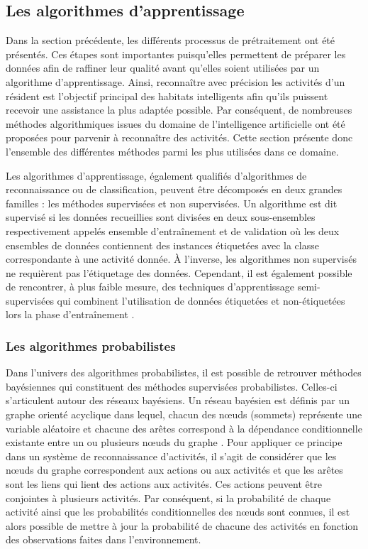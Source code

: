 \subsection{Les algorithmes d'apprentissage}

Dans la section précédente, les différents processus de prétraitement ont été présentés. Ces étapes sont importantes puisqu'elles permettent de préparer les données afin de raffiner leur qualité avant qu'elles soient utilisées par un algorithme d'apprentissage. Ainsi, reconnaître avec précision les activités d'un résident est l'objectif principal des habitats intelligents afin qu'ils puissent recevoir une assistance la plus adaptée possible. Par conséquent, de nombreuses méthodes algorithmiques issues du domaine de l'intelligence artificielle ont été proposées pour parvenir à reconnaître des activités. Cette section présente donc l'ensemble des différentes méthodes parmi les plus utilisées dans ce domaine. 

Les algorithmes d'apprentissage, également qualifiés d'algorithmes de reconnaissance ou de classification, peuvent être décomposés en deux grandes familles : les méthodes supervisées et non supervisées. Un algorithme est dit supervisé si les données recueillies sont divisées en deux sous-ensembles respectivement appelés ensemble d'entraînement et de validation où les deux ensembles de données contiennent des instances étiquetées avec la classe correspondante à une activité donnée. À l'inverse, les algorithmes non supervisés ne requièrent pas l'étiquetage des données. Cependant, il est également possible de rencontrer, à plus faible mesure, des techniques d'apprentissage semi-supervisées qui combinent l'utilisation de données étiquetées et non-étiquetées lors la phase d'entraînement \citep{Zhu2005, Chapelle2006}.

\subsubsection{Les algorithmes probabilistes}

Dans l'univers des algorithmes probabilistes, il est possible de retrouver méthodes bayésiennes qui constituent des méthodes supervisées probabilistes. Celles-ci s'articulent autour des réseaux bayésiens. Un réseau bayésien est définis par un graphe orienté acyclique dans lequel, chacun des n\oe{}uds (sommets) représente une variable aléatoire et chacune des arêtes correspond à la dépendance conditionnelle existante entre un ou plusieurs n\oe{}uds du graphe \citep{Heckerman1995}. Pour appliquer ce principe dans un système de reconnaissance d'activités, il s'agit de considérer que les n\oe{}uds du graphe correspondent aux actions ou aux activités et que les arêtes sont les liens qui lient des actions aux activités. Ces actions peuvent être conjointes à plusieurs activités. Par conséquent, si la probabilité de chaque activité ainsi que les probabilités conditionnelles des n\oe{}uds sont connues, il est alors possible de mettre à jour la probabilité de chacune des activités en fonction des observations faites dans l’environnement.


